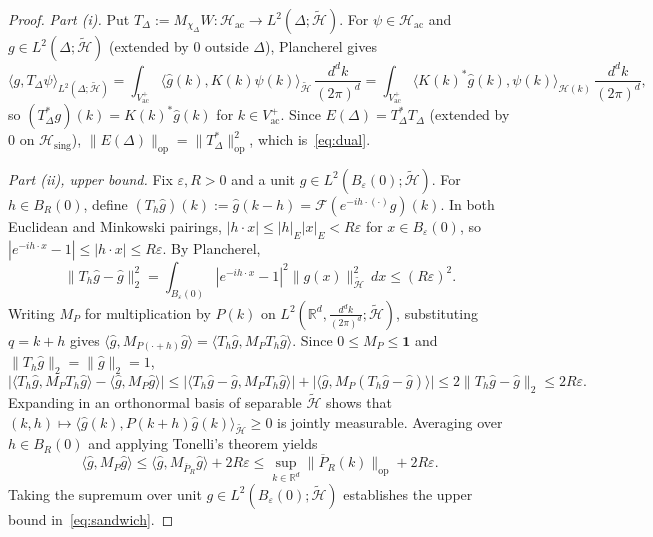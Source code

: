 \documentclass[11pt,a4paper]{article}
\theoremstyle{definition}
\theoremstyle{remark}
\newcommand{\HH}{\mathcal{H}}
\newcommand{\tH}{\widetilde{\mathcal{H}}}
\newcommand{\RR}{\mathbb{R}}
\newcommand{\op}{\mathrm{op}}
\newcommand{\ac}{\mathrm{ac}}
\newcommand{\sing}{\mathrm{sing}}
\newcommand{\one}{\mathbf{1}}
\newcommand{\ip}[2]{\langle #1, #2 \rangle}
\newcommand{\norm}[1]{\|#1\|}
\begin{document}
\begin{proof}
\emph{Part (i).} Put $T_\Delta := M_{\chi_\Delta} W : \HH_\ac \to L^2(\Delta;\tH)$. For $\psi\in\HH_\ac$ and $g\in L^2(\Delta;\tH)$ (extended by $0$ outside $\Delta$), Plancherel gives
\[
\ip{g}{T_\Delta\psi}_{L^2(\Delta;\tH)} = \int_{V_\ac^+} \ip{\widehat{g}(k)}{K(k)\psi(k)}_{\tH}\,\frac{d^dk}{(2\pi)^d}
= \int_{V_\ac^+} \ip{K(k)^*\widehat{g}(k)}{\psi(k)}_{\HH(k)}\,\frac{d^dk}{(2\pi)^d},
\]
so $(T_\Delta^* g)(k) = K(k)^*\widehat{g}(k)$ for $k\in V_\ac^+$. Since $E(\Delta) = T_\Delta^* T_\Delta$ (extended by $0$ on $\HH_\sing$), $\norm{E(\Delta)}_{\op} = \norm{T_\Delta^*}_{\op}^2$, which is~\eqref{eq:dual}.

\emph{Part (ii), upper bound.} Fix $\varepsilon, R>0$ and a unit $g\in L^2(B_\varepsilon(0);\tH)$. For $h\in B_R(0)$, define $(T_h\widehat{g})(k):=\widehat{g}(k-h)=\mathcal{F}(e^{-ih\cdot(\cdot)}g)(k)$. In both Euclidean and Minkowski pairings, $|h\cdot x|\le |h|_E |x|_E < R\varepsilon$ for $x\in B_\varepsilon(0)$, so $|e^{-ih\cdot x}-1|\le |h\cdot x|\le R\varepsilon$. By Plancherel,
\[
\norm{T_h\widehat{g}-\widehat{g}}_2^2 = \int_{B_\varepsilon(0)} |e^{-ih\cdot x}-1|^2\norm{g(x)}_{\tH}^2\,dx \le (R\varepsilon)^2.
\]
Writing $M_P$ for multiplication by $P(k)$ on $L^2(\RR^d,\frac{d^dk}{(2\pi)^d};\tH)$, substituting $q=k+h$ gives $\ip{\widehat{g}}{M_{P(\cdot+h)}\widehat{g}} = \ip{T_h\widehat{g}}{M_P T_h\widehat{g}}$. Since $0\le M_P\le\one$ and $\norm{T_h\widehat{g}}_2=\norm{\widehat{g}}_2=1$,
\[
\bigl|\ip{T_h\widehat{g}}{M_P T_h\widehat{g}} - \ip{\widehat{g}}{M_P\widehat{g}}\bigr|
\le \bigl|\ip{T_h\widehat{g}-\widehat{g}}{M_P T_h\widehat{g}}\bigr| + \bigl|\ip{\widehat{g}}{M_P(T_h\widehat{g}-\widehat{g})}\bigr|
\le 2\norm{T_h\widehat{g}-\widehat{g}}_2 \le 2R\varepsilon.
\]
Expanding in an orthonormal basis of separable $\tH$ shows that $(k,h)\mapsto \ip{\widehat{g}(k)}{P(k+h)\widehat{g}(k)}_{\tH}\ge 0$ is jointly measurable. Averaging over $h\in B_R(0)$ and applying Tonelli's theorem yields
\[
\ip{\widehat{g}}{M_P\widehat{g}} \le \ip{\widehat{g}}{M_{\overline{P}_R}\widehat{g}} + 2R\varepsilon \le \sup_{k\in\RR^d}\norm{\overline{P}_R(k)}_{\op} + 2R\varepsilon.
\]
Taking the supremum over unit $g\in L^2(B_\varepsilon(0);\tH)$ establishes the upper bound in~\eqref{eq:sandwich}.


\end{proof}
\end{document}
